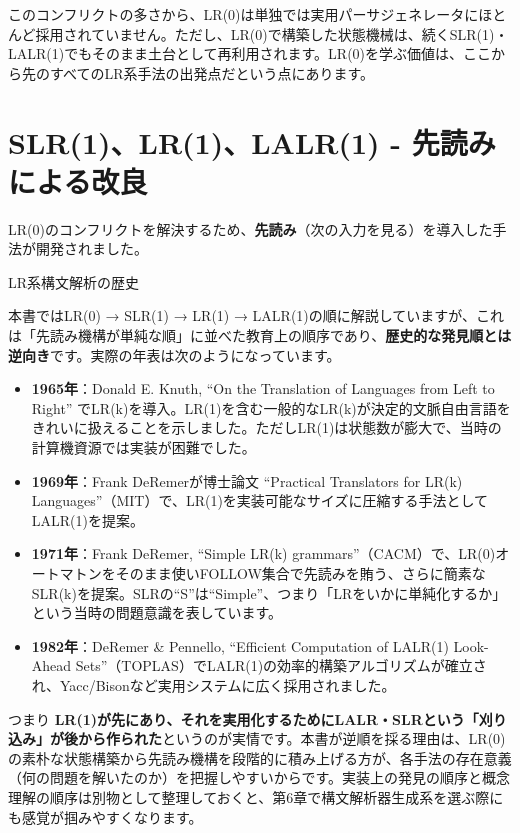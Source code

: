 このコンフリクトの多さから、LR(0)は単独では実用パーサジェネレータにほとんど採用されていません。ただし、LR(0)で構築した状態機械は、続くSLR(1)・LALR(1)でもそのまま土台として再利用されます。LR(0)を学ぶ価値は、ここから先のすべてのLR系手法の出発点だという点にあります。

\hypertarget{chapter5-slr1lr1lalr1---ux5148ux8aadux307fux306bux3088ux308bux6539ux826f}{%
\section{SLR(1)、LR(1)、LALR(1) -
先読みによる改良}\label{chapter5-slr1lr1lalr1---ux5148ux8aadux307fux306bux3088ux308bux6539ux826f}}

LR(0)のコンフリクトを解決するため、\textbf{先読み}（次の入力を見る）を導入した手法が開発されました。

\begin{kokocolumn}{LR系構文解析の歴史}

本書ではLR(0) → SLR(1) → LR(1) → LALR(1)の順に解説していますが、これは「先読み機構が単純な順」に並べた教育上の順序であり、\textbf{歴史的な発見順とは逆向き}です。実際の年表は次のようになっています。

\begin{itemize}
\tightlist
\item
  \textbf{1965年}：Donald E. Knuth, ``On the Translation of Languages from Left to Right'' でLR(k)を導入。LR(1)を含む一般的なLR(k)が決定的文脈自由言語をきれいに扱えることを示しました。ただしLR(1)は状態数が膨大で、当時の計算機資源では実装が困難でした。
\item
  \textbf{1969年}：Frank DeRemerが博士論文 ``Practical Translators for LR(k) Languages''（MIT）で、LR(1)を実装可能なサイズに圧縮する手法としてLALR(1)を提案。
\item
  \textbf{1971年}：Frank DeRemer, ``Simple LR(k) grammars''（CACM）で、LR(0)オートマトンをそのまま使いFOLLOW集合で先読みを賄う、さらに簡素なSLR(k)を提案。SLRの``S''は``Simple''、つまり「LRをいかに単純化するか」という当時の問題意識を表しています。
\item
  \textbf{1982年}：DeRemer \& Pennello, ``Efficient Computation of LALR(1) Look-Ahead Sets''（TOPLAS）でLALR(1)の効率的構築アルゴリズムが確立され、Yacc/Bisonなど実用システムに広く採用されました。
\end{itemize}

つまり \textbf{LR(1)が先にあり、それを実用化するためにLALR・SLRという「刈り込み」が後から作られた}というのが実情です。本書が逆順を採る理由は、LR(0)の素朴な状態構築から先読み機構を段階的に積み上げる方が、各手法の存在意義（何の問題を解いたのか）を把握しやすいからです。実装上の発見の順序と概念理解の順序は別物として整理しておくと、第6章で構文解析器生成系を選ぶ際にも感覚が掴みやすくなります。

\end{kokocolumn}

